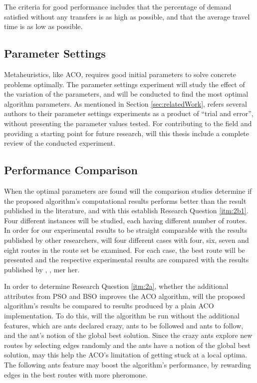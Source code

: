 The criteria for good performance includes that the percentage of demand satisfied without any transfers is as high as possible, and that the average travel time is as low as possible.

\subsection{Parameter Settings}
Metaheuristics, like ACO, requires good initial parameters to solve concrete problems optimally. The parameter settings experiment will study the effect of the variation of the parameters, and will be conducted to find the most optimal algorithm parameters. As mentioned in Section \vref{sec:relatedWork}, refers several authors to their parameter settings experiments as a product of ``trial and error'', without presenting the parameter values tested. For contributing to the field and providing a starting point for future research, will this thesis include a complete review of the conducted experiment. %

\subsection{Performance Comparison}
When the optimal parameters are found will the comparison studies determine if the proposed algorithm's computational results performs better than the result published in the literature, and with this establish Research Question \ref{itm:2b1}. Four different instances will be studied, each having different number of routes. In order for our experimental results to be straight comparable with the results published by other researchers, will four different cases with four, six, seven and eight routes in the route set be examined. For each case, the best route will be presented and the respective experimental results are compared with the results published by \citet{kechagiopoulos14}, \citet{mandl79}, \citet{fan09} mer her. 

In order to determine Research Question \vref{itm:2a}, whether the additional attributes from PSO and BSO improves the ACO algorithm, will the proposed algorithm's results be compared to results produced by a plain ACO implementation. To do this, will the algorithm  be run without the additional features, which are ants declared crazy, ants to be followed and ants to follow, and the ant's notion of the global best solution. Since the crazy ants explore new routes by selecting edges randomly and the ants have a notion of the global best solution, may this help the ACO's limitation of getting stuck at a local optima. The following ants feature may boost the algorithm's performance, by rewarding edges in the best routes with more pheromone. %

